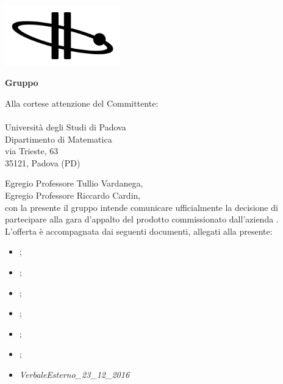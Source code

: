   
\begin{titlepage}
	
	\begin{center}
	 	
	\includegraphics[width=5cm]{../../modello/or-bit_bkg_minBorder.png} 
	\begin{Huge} 
	 	\textbf{Gruppo \GroupName{}}
	\end{Huge}
	\end{center}
	
	\vspace{0,5cm}
	\begin{large}
	\begin{flushright}
		Alla cortese attenzione del Committente: \\
		\Committente \\
		Università degli Studi di Padova \\
		Dipartimento di Matematica \\
		via Trieste, 63 \\
		35121, Padova (PD) 
		
		
	
	\end{flushright}

	\vspace{0,5cm}
	
	Egregio Professore Tullio Vardanega,\\
	Egregio Professore Riccardo Cardin, \\
	con la presente il gruppo \GroupName{} intende comunicare ufficialmente la decisione di partecipare alla gara d'appalto del prodotto \ProjectName{} commissionato dall'azienda \Proponente{}.\\
	
	
	L'offerta è accompagnata dai seguenti documenti, allegati alla presente:
	\begin{itemize}
		\item \AnalisiDeiRequisiti{};
		\item \Glossario{};
		\item \NormeDiProgetto{};
		\item \PianoDiProgetto{};
		\item \PianoDiQualifica{};
		\item \StudioDiFattibilita{};
		\item \emph{VerbaleEsterno\_23\_12\_2016}
	\end{itemize}
	

\end{large}
\end{titlepage}
